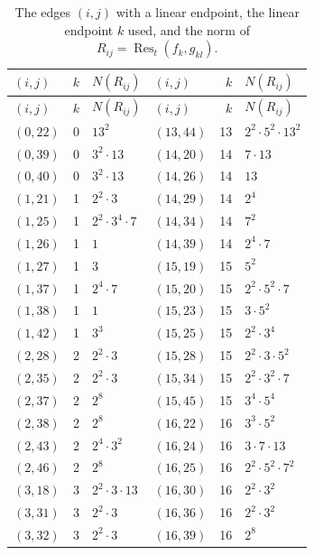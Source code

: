 \documentclass[11pt]{article}
\begin{document}
\begingroup\small
\setlength{\LTcapwidth}{\textwidth}
\begin{longtable}{@{}lrl@{\qquad}lrl@{}}
\caption{The edges $(i,j)$ with a linear endpoint, the linear endpoint $k$ used, and the norm of $R_{ij}=\operatorname{Res}_t(f_k,g_{kl})$.}\label{tab:csep}\\
\hline $(i,j)$ & $k$ & $N(R_{ij})$ & $(i,j)$ & $k$ & $N(R_{ij})$\\\hline\endfirsthead\hline $(i,j)$ & $k$ & $N(R_{ij})$ & $(i,j)$ & $k$ & $N(R_{ij})$\\\hline\endhead\hline\endfoot
$(0,22)$ & 0 & $13^{2}$ & $(13,44)$ & 13 & $2^{2}\cdot 5^{2}\cdot 13^{2}$\\
$(0,39)$ & 0 & $3^{2}\cdot 13$ & $(14,20)$ & 14 & $7\cdot 13$\\
$(0,40)$ & 0 & $3^{2}\cdot 13$ & $(14,26)$ & 14 & $13$\\
$(1,21)$ & 1 & $2^{2}\cdot 3$ & $(14,29)$ & 14 & $2^{4}$\\
$(1,25)$ & 1 & $2^{2}\cdot 3^{4}\cdot 7$ & $(14,34)$ & 14 & $7^{2}$\\
$(1,26)$ & 1 & $1$ & $(14,39)$ & 14 & $2^{4}\cdot 7$\\
$(1,27)$ & 1 & $3$ & $(15,19)$ & 15 & $5^{2}$\\
$(1,37)$ & 1 & $2^{4}\cdot 7$ & $(15,20)$ & 15 & $2^{2}\cdot 5^{2}\cdot 7$\\
$(1,38)$ & 1 & $1$ & $(15,23)$ & 15 & $3\cdot 5^{2}$\\
$(1,42)$ & 1 & $3^{3}$ & $(15,25)$ & 15 & $2^{2}\cdot 3^{4}$\\
$(2,28)$ & 2 & $2^{2}\cdot 3$ & $(15,28)$ & 15 & $2^{2}\cdot 3\cdot 5^{2}$\\
$(2,35)$ & 2 & $2^{2}\cdot 3$ & $(15,34)$ & 15 & $2^{2}\cdot 3^{2}\cdot 7$\\
$(2,37)$ & 2 & $2^{8}$ & $(15,45)$ & 15 & $3^{4}\cdot 5^{4}$\\
$(2,38)$ & 2 & $2^{8}$ & $(16,22)$ & 16 & $3^{3}\cdot 5^{2}$\\
$(2,43)$ & 2 & $2^{4}\cdot 3^{2}$ & $(16,24)$ & 16 & $3\cdot 7\cdot 13$\\
$(2,46)$ & 2 & $2^{8}$ & $(16,25)$ & 16 & $2^{2}\cdot 5^{2}\cdot 7^{2}$\\
$(3,18)$ & 3 & $2^{2}\cdot 3\cdot 13$ & $(16,30)$ & 16 & $2^{2}\cdot 3^{2}$\\
$(3,31)$ & 3 & $2^{2}\cdot 3$ & $(16,36)$ & 16 & $2^{2}\cdot 3^{2}$\\
$(3,32)$ & 3 & $2^{2}\cdot 3$ & $(16,39)$ & 16 & $2^{8}$\\

\end{longtable}
\end{document}
